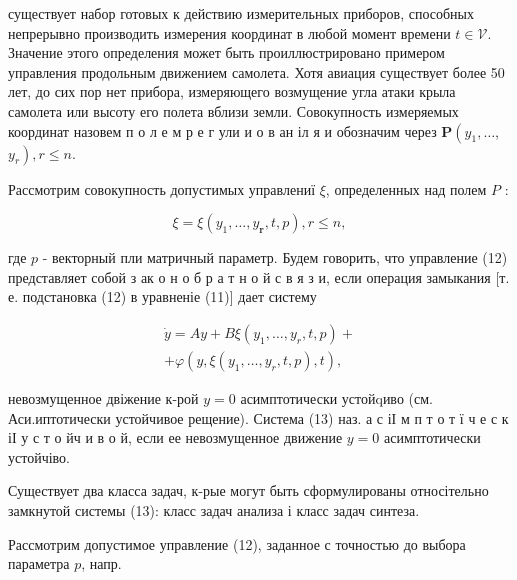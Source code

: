 \documentclass[10pt]{article}
\begin{document}
существует набор готовых к действию измерительных приборов, способных непрерывно производить измерения координат в любой момент времени $t \in \mathscr{V}$. Значение этого определения может быть проиллюстрировано примером управления продольным движением самолета. Хотя авиация существует более 50 лет, до сих пор нет прибора, измеряющего возмущение угла атаки крыла самолета или высоту его полета вблизи земли. Совокупность измеряемых координат назовем п о л е м р е г ули и о в ан іл я и обозначим через $\boldsymbol{P}\left(y_{1}, \ldots\right.$, $\left.y_{r}\right), r \leqslant n$.



Рассмотрим совокупность допустимых управлениї $\xi$, определенных над полем $P$ :



\[

\xi=\xi\left(y_{1}, \ldots, y_{\boldsymbol{r}}, t, p\right), r \leqslant n,

\]



где $p$ - векторный пли матричный параметр. Будем говорить, что управление (12) представляет собой з ак о н о б р а т н о й с в я з и, если операция замыкания [т. е. подстановка (12) в уравненіе (11)] дает систему



\[

\begin{gathered}

\dot{y}=A y+B \xi\left(y_{1}, \ldots, y_{r}, t, p\right)+ \\

+\varphi\left(y, \xi\left(y_{1}, \ldots, y_{r}, t, p\right), t\right),

\end{gathered}

\]



невозмущенное двіжение к-рой $y=0$ асимптотически устойqиво (см. Аси.иптотически устойчивое рещение). Система (13) наз. а с іІ м п т о т ї ч е с к іІ у с т о йч и в о й, если ее невозмущенное движение $y=0$ асимптотически устойчіво.



Существует два класса задач, к-рые могут быть сформулированы относітельно замкнутой системы (13): класс задач анализа і класс задач синтеза.



Рассмотрим допустимое управление (12), заданное с точностью до выбора параметра $p$, напр.
\end{document}
